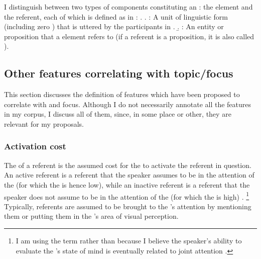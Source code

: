 
I distinguish between two types of components constituting an :
the  element and the  referent,
each of which is defined as in \Next:
\ex.
	\a. : {A unit of linguistic form (including zero ) that is uttered by the participants in .}
	\b. : {An entity or proposition that a  element refers to (if a referent is a proposition, it is also called ).}



\subsection{Other features correlating with topic/focus}\label{FrameworkOthFeatures}

This section discusses the definition of features which have been
proposed to correlate with  and focus.
Although I do not necessarily annotate all the features in my corpus,
I discuss all of them,
since, in some place or other, they are relevant for my proposals.



\subsubsection{Activation cost}\label{FrameworkActivation}
The  of a referent is the assumed cost for the  to activate the referent in question.
An active referent is a referent
that the speaker assumes to be in the attention of the  (for which the  is hence low),
while an inactive referent is a referent
that the speaker does not assume to be in the attention of the  (for which the  is high)
\cite[see also][inter alia]{chafe94}.%
	\footnote{
	I am using the term  rather than 
	because I believe the speaker's ability to evaluate the 's state of mind is eventually related to joint attention \cite{tomasello99}.
	}
Typically,
referents are assumed to be brought to the 's attention
by mentioning them or putting them in the 's area of visual perception.

